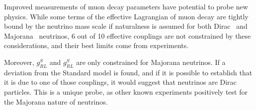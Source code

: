 
Improved measurements of muon decay parameters have potential to probe new physics.  While some terms of the effective Lagrangian of muon decay are tightly bound by the neutrino mass scale if naturalness is assumed for both Dirac~\cite{erwin:2006}
and Majorana~\cite{erwin:2007}
neutrinos, 6 out of 10 effective couplings are not constrained by these considerations, and their best limits come from experiments.

Moreover, $g^{S}_{RL}$ and $g^{S}_{RL}$ are only constrained for Majorana neutrinos.  If a deviation from the Standard model is found, and if it is possible to establish that it is due to one of those couplings, it would suggest that neutrinos are Dirac particles.  This is a unique probe, as other known experiments positively test for the Majorana nature of neutrinos.

